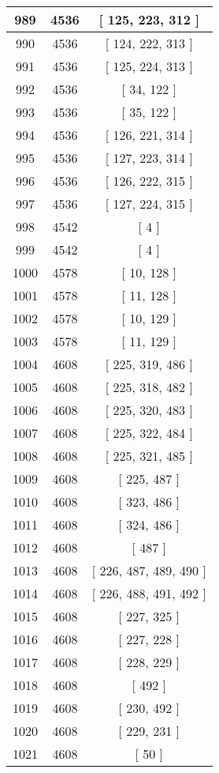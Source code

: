 \begin{center}
\begin{longtable}[H]{|| c c c ||}
\hline
989 & 4536 & [ 125, 223, 312 ] \\ 
\hline
990 & 4536 & [ 124, 222, 313 ] \\ 
\hline
991 & 4536 & [ 125, 224, 313 ] \\ 
\hline
992 & 4536 & [ 34, 122 ] \\ 
\hline
993 & 4536 & [ 35, 122 ] \\ 
\hline
994 & 4536 & [ 126, 221, 314 ] \\ 
\hline
995 & 4536 & [ 127, 223, 314 ] \\ 
\hline
996 & 4536 & [ 126, 222, 315 ] \\ 
\hline
997 & 4536 & [ 127, 224, 315 ] \\ 
\hline
998 & 4542 & [ 4 ] \\ 
\hline
999 & 4542 & [ 4 ] \\ 
\hline
1000 & 4578 & [ 10, 128 ] \\ 
\hline
1001 & 4578 & [ 11, 128 ] \\ 
\hline
1002 & 4578 & [ 10, 129 ] \\ 
\hline
1003 & 4578 & [ 11, 129 ] \\ 
\hline
1004 & 4608 & [ 225, 319, 486 ] \\ 
\hline
1005 & 4608 & [ 225, 318, 482 ] \\ 
\hline
1006 & 4608 & [ 225, 320, 483 ] \\ 
\hline
1007 & 4608 & [ 225, 322, 484 ] \\ 
\hline
1008 & 4608 & [ 225, 321, 485 ] \\ 
\hline
1009 & 4608 & [ 225, 487 ] \\ 
\hline
1010 & 4608 & [ 323, 486 ] \\ 
\hline
1011 & 4608 & [ 324, 486 ] \\ 
\hline
1012 & 4608 & [ 487 ] \\ 
\hline
1013 & 4608 & [ 226, 487, 489, 490 ] \\ 
\hline
1014 & 4608 & [ 226, 488, 491, 492 ] \\ 
\hline
1015 & 4608 & [ 227, 325 ] \\ 
\hline
1016 & 4608 & [ 227, 228 ] \\ 
\hline
1017 & 4608 & [ 228, 229 ] \\ 
\hline
1018 & 4608 & [ 492 ] \\ 
\hline
1019 & 4608 & [ 230, 492 ] \\ 
\hline
1020 & 4608 & [ 229, 231 ] \\ 
\hline
1021 & 4608 & [ 50 ] \\ 

\end{longtable}
\end{center}
